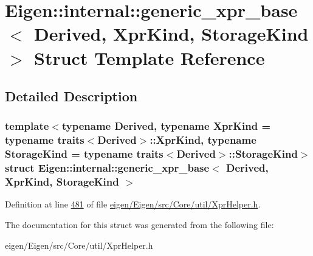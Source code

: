 \hypertarget{struct_eigen_1_1internal_1_1generic__xpr__base}{}\section{Eigen\+:\+:internal\+:\+:generic\+\_\+xpr\+\_\+base$<$ Derived, Xpr\+Kind, Storage\+Kind $>$ Struct Template Reference}
\label{struct_eigen_1_1internal_1_1generic__xpr__base}


\subsection{Detailed Description}
\subsubsection*{template$<$typename Derived, typename Xpr\+Kind = typename traits$<$\+Derived$>$\+::\+Xpr\+Kind, typename Storage\+Kind = typename traits$<$\+Derived$>$\+::\+Storage\+Kind$>$\newline
struct Eigen\+::internal\+::generic\+\_\+xpr\+\_\+base$<$ Derived, Xpr\+Kind, Storage\+Kind $>$}



Definition at line \hyperlink{eigen_2_eigen_2src_2_core_2util_2_xpr_helper_8h_source_l00481}{481} of file \hyperlink{eigen_2_eigen_2src_2_core_2util_2_xpr_helper_8h_source}{eigen/\+Eigen/src/\+Core/util/\+Xpr\+Helper.\+h}.



The documentation for this struct was generated from the following file\+:\begin{DoxyCompactItemize}
\item 
eigen/\+Eigen/src/\+Core/util/\+Xpr\+Helper.\+h\end{DoxyCompactItemize}
